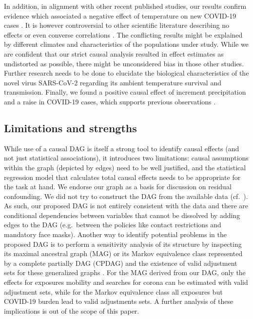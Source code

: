 \documentclass[]{elsarticle} %
\begin{document}
In addition, in alignment with other recent published studies, our results confirm evidence which associated a negative effect of temperature on new COVID-19 cases \citep{bannister-tyrrell_preliminary_2020, demongeot_temperature_2020, liu_impact_2020, qi_covid-19_2020, shi_impact_2020, sobral_association_2020, tosepu_correlation_2020, Wang2020temperature, wu_effects_2020}. It is however controversial to other scientific literature describing no effects \citep{briz-redon_spatio-temporal_2020, iqbal_nexus_2020, jahangiri_sensitivity_2020, juni_impact_2020, yao_no_2020} or even converse correlations \citep{auler_evidence_2020, xie_association_2020}. The conflicting results might be explained by different climates and characteristics of the populations under study. While we are confident that our strict causal analysis resulted in effect estimates as undistorted as possible, there might be unconsidered bias in those other studies. Further research needs to be done to elucidate the biological characteristics of the novel virus SARS-CoV-2 regarding its ambient temperature survival and transmission. Finally, we found a positive causal effect of increment precipitation and a raise in COVID-19 cases, which supports previous observations \citep{sobral_association_2020}.

\hypertarget{limitations-and-strengths}{%
\subsection{Limitations and strengths}\label{limitations-and-strengths}}

While use of a causal DAG is itself a strong tool to identify causal effects (and not just statistical associations), it introduces two limitations: causal assumptions within the graph (depicted by edges) need to be well justified, and the statistical regression model that calculates total causal effects needs to be appropriate for the task at hand. We endorse our graph as a basis for discussion on residual confounding. We did not try to construct the DAG from the available data (cf.~\citep{gencoglu2020causal}). As such, our proposed DAG is not entirely consistent with the data and there are conditional dependencies between variables that cannot be dissolved by adding edges to the DAG (e.g.~between the policies like contact restrictions and mandatory face masks). Another way to identify potential problems in the proposed DAG is to perform a sensitivity analysis of its structure by inspecting its maximal ancestral graph (MAG) or its Markov equivalence class represented by a complete partially DAG (CPDAG) and the existence of valid adjustment sets for these generalized graphs \citep{perkovic2017complete}. For the MAG derived from our DAG, only the effects for exposures mobility and searches for corona can be estimated with valid adjustment sets, while for the Markov equivalence class all exposures but COVID-19 burden lead to valid adjustments sets. A further analysis of these implications is out of the scope of this paper.
\end{document}
